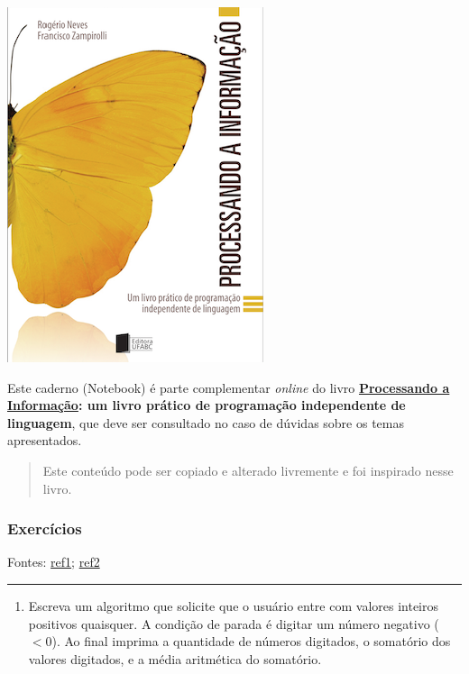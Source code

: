 \documentclass[12pt,a4paper]{article}
\providecommand{\tightlist}{%
      \setlength{\itemsep}{0pt}\setlength{\parskip}{0pt}}
\begin{document}
    \includegraphics{"figs/Capa_Processando_Informacao.jpg"}

Este caderno (Notebook) é parte complementar \emph{online} do livro
\textbf{\href{https://editora.ufabc.edu.br/matematica-e-ciencias-da-computacao/58-processando-a-informacao}{Processando
a Informação}: um livro prático de programação independente de
linguagem}, que deve ser consultado no caso de dúvidas sobre os temas
apresentados.

\begin{quote}
Este conteúdo pode ser copiado e alterado livremente e foi inspirado
nesse livro.
\end{quote}

    \hypertarget{exercuxedcios}{%
\subsubsection{Exercícios}\label{exercuxedcios}}

Fontes:
\href{https://docente.ifrn.edu.br/jonathanpereira/disciplinas/algoritmos/estruturas-de-repeticao/view}{ref1};
\href{https://www.inf.pucrs.br/~pinho/LaproI/Exercicios/Repeticao/Lista1.htm}{ref2}

    \begin{center}\rule{0.5\linewidth}{0.5pt}\end{center}

\begin{enumerate}
\def\labelenumi{\arabic{enumi}.}
\tightlist
\item
  Escreva um algoritmo que solicite que o usuário entre com valores
  inteiros positivos quaisquer. A condição de parada é digitar um número
  negativo (\(<0\)). Ao final imprima a quantidade de números digitados,
  o somatório dos valores digitados, e a média aritmética do somatório.
\end{enumerate}
\end{document}
